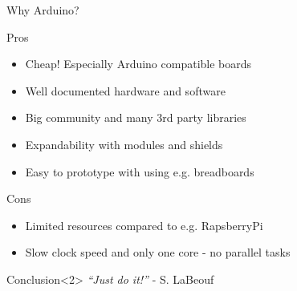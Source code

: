 \begin{frame}{Why Arduino?}
	\begin{block}{Pros}
		\begin{itemize}
			\item Cheap! Especially \textcolor{ReneOrange}{Arduino compatible} boards
			\item Well documented hardware and software
			\item Big community and many \textcolor{ReneOrange}{3rd party libraries}
			\item Expandability with \textcolor{ReneOrange}{modules} and shields
			\item Easy to \textcolor{ReneOrange}{prototype} with using e.g. breadboards
		\end{itemize}		
	\end{block}	
	\begin{block}{Cons}
		\begin{itemize}
			\item Limited resources compared to e.g. RapsberryPi
			\item Slow clock speed and only one core - \textcolor{ReneOrange}{no parallel tasks}
		\end{itemize}	
	\end{block}
	\begin{exampleblock}{Conclusion}<2>
		\emph{``Just do it!''} - S. LaBeouf
	\end{exampleblock}		
\end{frame}
